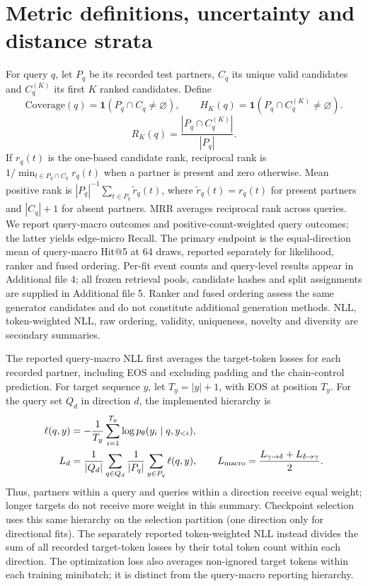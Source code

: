 \documentclass[a4paper,11pt]{article}
\begin{document}
\section{Metric definitions, uncertainty and distance strata}
For query $q$, let $P_q$ be its recorded test partners, $C_q$ its unique valid
candidates and $C_q^{(K)}$ its first $K$ ranked candidates. Define
\begin{equation}
\mathrm{Coverage}(q)=\mathbf{1}(P_q\cap C_q\ne\varnothing),\qquad
H_K(q)=\mathbf{1}(P_q\cap C_q^{(K)}\ne\varnothing).
\end{equation}
\begin{equation}
R_K(q)=\frac{|P_q\cap C_q^{(K)}|}{|P_q|}.
\end{equation}
If $r_q(t)$ is the one-based candidate rank, reciprocal rank is
$1/\min_{t\in P_q\cap C_q}r_q(t)$ when a partner is present and zero otherwise.
Mean positive rank is $|P_q|^{-1}\sum_{t\in P_q}\widetilde r_q(t)$,
where $\widetilde r_q(t)=r_q(t)$ for present partners and $|C_q|+1$ for absent
partners. MRR averages reciprocal rank across queries. We report query-macro outcomes and positive-count-weighted query
outcomes; the latter yields edge-micro Recall. The primary endpoint is the
equal-direction mean of query-macro Hit@5 at 64 draws, reported separately for
likelihood, ranker and fused ordering. Per-fit event counts and query-level results appear in Additional file 4;
all frozen retrieval pools, candidate hashes and split assignments are supplied
in Additional file 5. Ranker and fused ordering assess the same generator
candidates and do not constitute additional generation methods.
NLL, token-weighted NLL, raw ordering,
validity, uniqueness, novelty and diversity are secondary summaries.

The reported query-macro NLL first averages the target-token losses for each
recorded partner, including EOS and excluding padding and the chain-control
prediction. For target sequence $y$, let $T_y=|y|+1$, with EOS at position $T_y$.
For the query set $Q_d$ in direction $d$, the implemented hierarchy is
\begin{align}
\ell(q,y)&=-\frac{1}{T_y}\sum_{i=1}^{T_y}
 \log p_\theta(y_i\mid q,y_{<i}),\\
L_d&=\frac{1}{|Q_d|}\sum_{q\in Q_d}
 \frac{1}{|P_q|}\sum_{y\in P_q}\ell(q,y),\qquad
L_{\rm macro}=\frac{L_{\gamma\rightarrow\delta}
 +L_{\delta\rightarrow\gamma}}{2}.
\end{align}
Thus, partners within a query and queries within a direction receive equal
weight; longer targets do not receive more weight in this summary.
Checkpoint selection uses this same hierarchy on the selection partition
(one direction only for directional fits).
The separately reported token-weighted NLL instead divides the sum of all
recorded target-token losses by their total token count within each direction.
The optimization loss also averages non-ignored target tokens within each
training minibatch; it is distinct from the query-macro reporting hierarchy.
\end{document}
